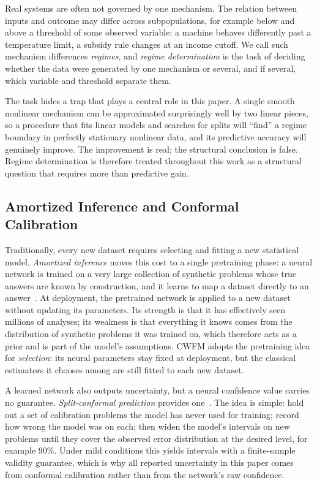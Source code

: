 \documentclass[electronics,article,submit,oneauthor]{Definitions/mdpi}
\begin{document}
Real systems are often not governed by one mechanism. The relation between inputs and outcome may differ across subpopulations, for example below and above a threshold of some observed variable: a machine behaves differently past a temperature limit, a subsidy rule changes at an income cutoff. We call such mechanism differences \emph{regimes}, and \emph{regime determination} is the task of deciding whether the data were generated by one mechanism or several, and if several, which variable and threshold separate them.

The task hides a trap that plays a central role in this paper. A single smooth nonlinear mechanism can be approximated surprisingly well by two linear pieces, so a procedure that fits linear models and searches for splits will ``find'' a regime boundary in perfectly stationary nonlinear data, and its predictive accuracy will genuinely improve. The improvement is real; the structural conclusion is false. Regime determination is therefore treated throughout this work as a structural question that requires more than predictive gain.

\subsection{Amortized Inference and Conformal Calibration}\label{sec:prelim-amortized}

Traditionally, every new dataset requires selecting and fitting a new statistical model. \emph{Amortized inference} moves this cost to a single pretraining phase: a neural network is trained on a very large collection of synthetic problems whose true answers are known by construction, and it learns to map a dataset directly to an answer~\cite{muller2022pfns}. At deployment, the pretrained network is applied to a new dataset without updating its parameters. Its strength is that it has effectively seen millions of analyses; its weakness is that everything it knows comes from the distribution of synthetic problems it was trained on, which therefore acts as a prior and is part of the model's assumptions. CWFM adopts the pretraining idea for \emph{selection}: its neural parameters stay fixed at deployment, but the classical estimators it chooses among are still fitted to each new dataset.

A learned network also outputs uncertainty, but a neural confidence value carries no guarantee. \emph{Split-conformal prediction} provides one~\cite{vovk2005conformal,lei2018distribution}. The idea is simple: hold out a set of calibration problems the model has never used for training; record how wrong the model was on each; then widen the model's intervals on new problems until they cover the observed error distribution at the desired level, for example 90\%. Under mild conditions this yields intervals with a finite-sample validity guarantee, which is why all reported uncertainty in this paper comes from conformal calibration rather than from the network's raw confidence.
\end{document}
